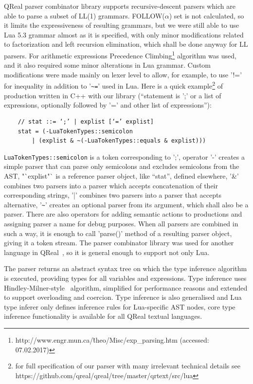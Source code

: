 \documentclass[conference]{IEEEtran}
\begin{document}
QReal parser combinator library supports recursive-descent parsers which are able to parse a subset of LL(1) grammars. FOLLOW($\alpha$) set is not calculated, so it limits the expressiveness of resulting grammars, but we were still able to use Lua 5.3 grammar almost as it is specified, with only minor modifications related to factorization and left recursion elimination, which shall be done anyway for LL parsers. For arithmetic expressions Precedence Climbing\footnote{http://www.engr.mun.ca/\~theo/Misc/exp\_parsing.htm (accessed: 07.02.2017)} algorithm was used, and it also required some minor alterations in Lua grammar. Custom modifications were made mainly on lexer level to allow, for example, to use '!=' for inequality in addition to '\verb|~=|' used in Lua. Here is a quick example\footnote{for full specification of our parser with many irrelevant technical details see https://github.com/qreal/qreal/tree/master/qrtext/src/lua} of production written in C++ with our library ("`statement is ';' or a list of expressions, optionally followed by '=' and other list of expressions"'):
\begin{verbatim}
	// stat ::= ‘;’ | explist [‘=’ explist]
	stat = (-LuaTokenTypes::semicolon 
	    | (explist & ~(-LuaTokenTypes::equals & explist)))
\end{verbatim}

\verb|LuaTokenTypes::semicolon| is a token corresponding to ';', operator '-' creates a simple parser that can parse only semicolons and excludes semicolons from the AST, "`explist"` is a reference parser object, like "`stat"', defined elsewhere, '\&' combines two parsers into a parser which accepts concatenation of their corresponding strings, '|' combines two parsers into a parser that accepts alternative, '\verb|~|' creates an optional parser from its argument, which shall also be a parser. There are also operators for adding semantic actions to productions and assigning parser a name for debug purposes. When all parsers are combined in such a way, it is enough to call 'parse()' method of a resulting parser object, giving it a token stream. The parser combinator library was used for another language in QReal~\cite{tikhonova2015generation}, so it is general enough to support not only Lua.

The parser returns an abstract syntax tree on which the type inference algorithm is executed, providing types for all variables and expressions. Type inference uses Hindley-Milner-style~\cite{damas1982principal} algorithm, simplified for performance reasons and extended to support overloading and coercion. Type inference is also generalised and Lua type inferer only defines inference rules for Lua-specific AST nodes, core type inference functionality is available for all QReal textual languages.
\end{document}
